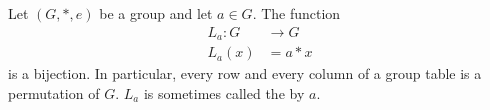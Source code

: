 Let $(G, *, e)$ be a group and let $a \in G$.
The function
\begin{align*}
L_a: G &\rightarrow G \\
L_a(x) &= a * x
\end{align*}
is a bijection.
In particular, every row and every column
of a group table is a permutation of $G$.
$L_a$ is sometimes called the  by $a$.
